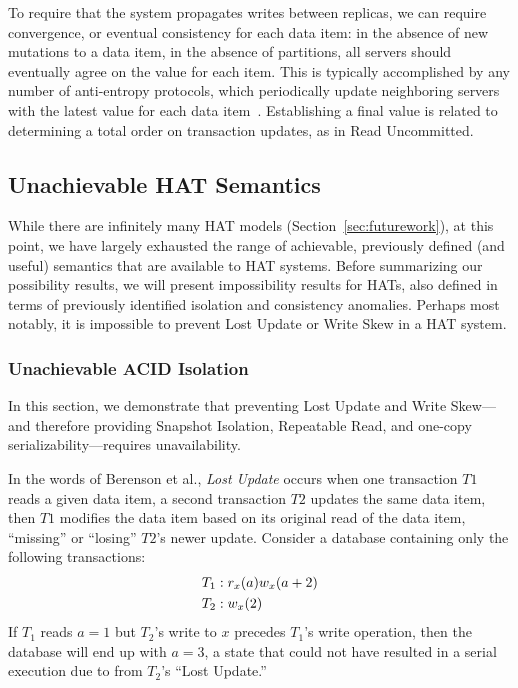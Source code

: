 \vspace{.5em} To require that the
system propagates writes between replicas, we can require convergence,
or eventual consistency for each data item: in the absence of new
mutations to a data item, in the absence of partitions, all servers
should eventually agree on the value for each item. This is typically
accomplished by any number of anti-entropy protocols, which
periodically update neighboring servers with the latest value for each
data item~\cite{antientropy}. Establishing a final value is related to
determining a total order on transaction updates, as in Read
Uncommitted.

\subsection{Unachievable HAT Semantics}
\label{sec:unachievable-hat}

While there are infinitely many HAT models
(Section~\ref{sec:futurework}), at this point, we have largely
exhausted the range of achievable, previously defined (and useful)
semantics that are available to HAT systems. Before summarizing our
possibility results, we will present impossibility results for HATs,
also defined in terms of previously identified isolation and
consistency anomalies. Perhaps most notably, it is impossible to
prevent Lost Update or Write Skew in a HAT system.

\subsubsection{Unachievable ACID Isolation}

In this section, we demonstrate that preventing Lost Update and Write
Skew---and therefore providing Snapshot Isolation, Repeatable Read,
and one-copy serializability---requires unavailability.

In the words of Berenson et al., \textit{Lost Update} occurs when one
transaction $T1$ reads a given data item, a second transaction $T2$
updates the same data item, then $T1$ modifies the data item based on
its original read of the data item, ``missing'' or ``losing'' $T2$'s
newer update. Consider a database containing only the following
transactions:
\begin{align*}
\small
T_1 &: r_x(a) w_x(a+2)
\\T_2 &: w_x(2)
\end{align*}
If $T_1$ reads $a=1$ but $T_2$'s write to $x$ precedes $T_1$'s write
operation, then the database will end up with $a=3$, a state that
could not have resulted in a serial execution due to from $T_2$'s
``Lost Update.''

